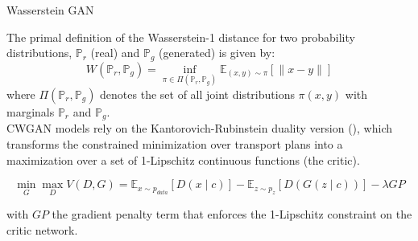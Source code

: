 \begin{frame}{Wasserstein GAN}
    
The primal definition of the Wasserstein-1 distance 
for two probability distributions, $\mathbb{P}_r$ (real) and $\mathbb{P}_g$ (generated) is given 
by:
\begin{equation*}
    W(\mathbb{P}_r, \mathbb{P}_g) = \inf_{\pi \in \Pi(\mathbb{P}_r, \mathbb{P}_g)} \mathbb{E}_{(x, y) \sim \pi} [\|x - y\|]
\end{equation*}
where $\Pi(\mathbb{P}_r, \mathbb{P}_g)$ denotes the set of all joint distributions $\pi(x, y)$ with marginals $\mathbb{P}_r$ and $\mathbb{P}_g$.\\
\vspace{1cm}
CWGAN models rely on the Kantorovich-Rubinstein duality version (\cite{background:wgan}), which
transforms the constrained minimization over transport plans into a maximization over a
set of 1-Lipschitz continuous functions (the critic).

\begin{equation}
\min_G \max_D V(D,G) = \mathbb{E}_{x \sim p_{data}}[D(x \mid c)] 
- \mathbb{E}_{z \sim p_z}[D(G(z \mid c))]
- \lambda GP
\end{equation}

with $GP$ the gradient penalty term that enforces the 1-Lipschitz constraint on the critic network.
\end{frame}
    
